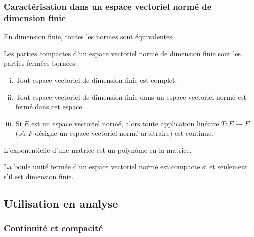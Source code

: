 	\subsubsection{Caractérisation dans un espace vectoriel normé de dimension finie}


	\begin{theorem}
		En dimension finie, toutes les normes sont équivalentes.
	\end{theorem}

	\begin{corollary}
		Les parties compactes d'un espace vectoriel normé de dimension finie sont les parties fermées bornées.
	\end{corollary}

	\begin{corollary}
		\begin{enumerate}[(i)]
			\item Tout espace vectoriel de dimension finie est complet.
			\item Tout espace vectoriel de dimension finie dans un espace vectoriel normé est fermé dans cet espace.
			\item Si $E$ est un espace vectoriel normé, alors toute application linéaire $T : E \rightarrow F$ (où $F$ désigne un espace vectoriel normé arbitraire) est continue.
		\end{enumerate}
	\end{corollary}


	\begin{application}
		L'exponentielle d'une matrice est un polynôme en la matrice.
	\end{application}


	\begin{theorem}[Riesz]
		La boule unité fermée d'un espace vectoriel normé est compacte si et seulement s'il est dimension finie.
	\end{theorem}

	\subsection{Utilisation en analyse}

	\subsubsection{Continuité et compacité}

